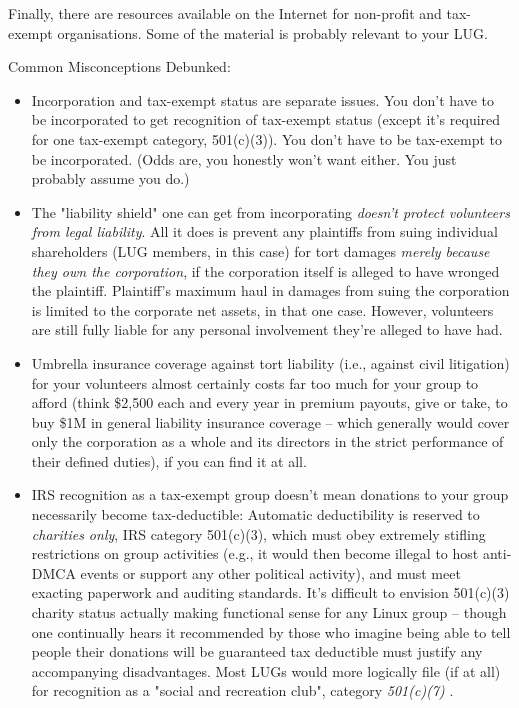 \documentclass{HOWTO}
\begin{document}
Finally, there are resources available on the Internet for non-profit
and tax-exempt organisations. Some of the material is probably
relevant to your LUG.

Common Misconceptions Debunked:

\begin{itemize}
\item Incorporation and tax-exempt status are separate issues.  You don't have to be incorporated to get recognition of tax-exempt status (except it's required for one tax-exempt category, 501(c)(3)).  You don't have to be tax-exempt to be incorporated.  (Odds are, you honestly won't want either.  You just probably assume you do.)

\item The "liability shield" one can get from incorporating {\itshape doesn't 
protect volunteers from legal liability\/}.  All it does is prevent any 
plaintiffs from suing individual shareholders (LUG members, in this case) 
for tort damages {\itshape merely because they own the corporation\/}, if the 
corporation itself is alleged to have wronged the plaintiff.  Plaintiff's 
maximum haul in damages from suing the corporation is limited to the 
corporate net assets, in that one case.  However, volunteers are still
fully liable for any personal involvement they're alleged to have had.

\item Umbrella insurance coverage against tort liability (i.e., against civil litigation) for your volunteers almost certainly costs far too much for your group to afford (think \$2,500 each and every year in premium payouts, give or take, to buy \$1M in general liability insurance coverage -- which generally would cover only the corporation as a whole and its directors in the strict performance of their defined duties), if you can find it at all.

\item IRS recognition as a tax-exempt group doesn't mean donations to
your group necessarily become tax-deductible:  Automatic deductibility is
reserved to {\itshape charities only\/}, IRS category 501(c)(3), which must obey 
extremely stifling restrictions on group activities (e.g., it would then 
become illegal to host anti-DMCA events or support any other political
activity), and must meet exacting paperwork and auditing standards.  It's 
difficult to envision 501(c)(3) charity status actually making functional 
sense for any Linux group -- though one continually hears it recommended by
those who imagine being able to tell people their donations will be guaranteed tax deductible must justify any accompanying disadvantages.  Most LUGs would more logically file (if at all) for recognition as a "social and recreation club", category 
\emph{501(c)(7)} \texttt{\aenurl}
.


\end{itemize}
\end{document}
